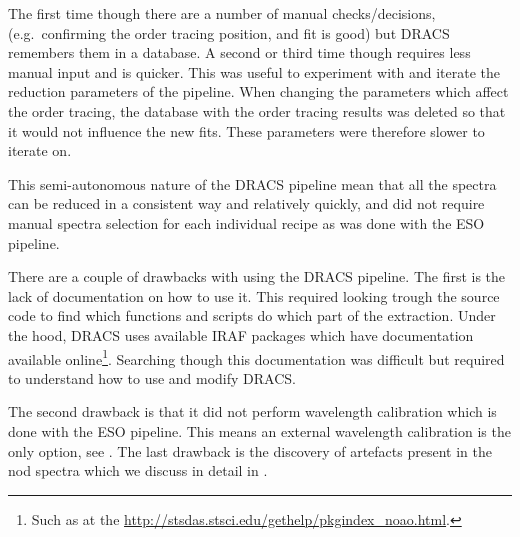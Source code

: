 The first time though there are a number of manual checks/decisions, (e.g.\ confirming the order tracing position, and fit is good) but {DRACS} remembers them in a database. A second or third time though requires less manual input and is quicker. This was useful to experiment with and iterate the reduction parameters of the pipeline. When changing the parameters which affect the order tracing, the database with the order tracing results was deleted so that it would not influence the new fits. These parameters were therefore slower to iterate on.

This semi-autonomous nature of the {DRACS} pipeline mean that all the spectra can be reduced in a consistent way and relatively quickly, and did not require manual spectra selection for each individual recipe as was done with the {ESO} pipeline.

There are a couple of drawbacks with using the {DRACS} pipeline. The first is the lack of documentation on how to use it. This required looking trough the source code to find which functions and scripts do which part of the extraction. Under the hood, {DRACS} uses available {IRAF} packages which have documentation available online\footnote{Such as at the \href{Space Telescope Science Institute}{http://stsdas.stsci.edu/gethelp/pkgindex\_noao.html}.}. Searching though this documentation was difficult but required to understand how to use and modify {DRACS}.

The second drawback is that it did not perform wavelength calibration which is done with the {ESO} pipeline. This means an external wavelength calibration is the only option, see . The last drawback is the discovery of artefacts present in the nod spectra which we discuss in detail in
.

